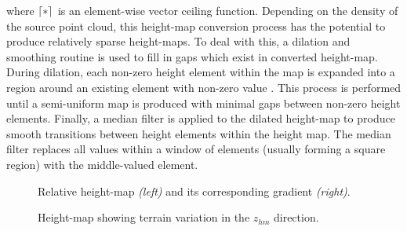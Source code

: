 			where $\left\lceil*\right\rceil$ is an element-wise vector ceiling function. Depending on the density of the source point cloud, this height-map conversion process has the potential to produce relatively sparse height-maps. To deal with this, a dilation and smoothing routine is used to fill in gaps which exist in converted height-map. During dilation, each non-zero height element within the map is expanded into a region around an existing element with non-zero value \cite{opencv_learn_immorph}. This process is performed until a semi-uniform map is produced with minimal gaps between non-zero height elements. Finally, a median filter is applied to the dilated height-map to produce smooth transitions between height elements within the height map. The median filter replaces all values within a window of elements (usually forming a square region) with the middle-valued element.
				\begin{figure}[t!]
					\centering
					\caption{Relative height-map \emph{(left)} and its corresponding gradient \emph{(right)}.}
					\label{fig::heightmap_terrain_patch}
				\end{figure}
				\begin{figure}[h!]
					\centering
					\caption{Height-map showing terrain variation in the $z_{hm}$ direction.}
					\label{fig::heightmap_terrain_patch_ortho}
				\end{figure}							

